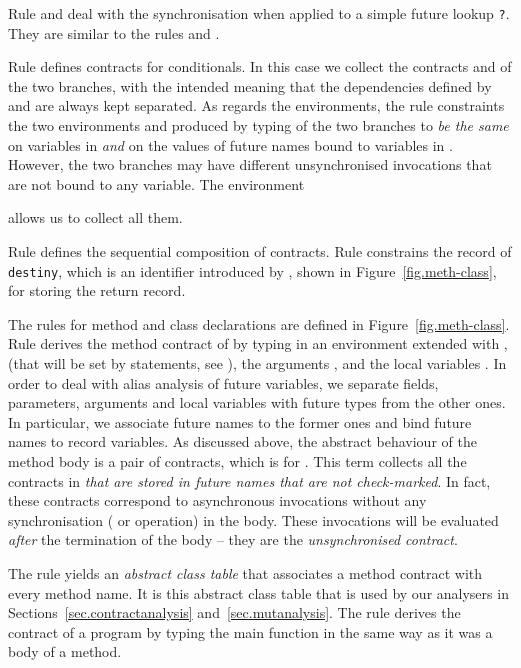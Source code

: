 Rule  and  deal with the 
synchronisation when applied to a simple future lookup {\tt ?}. They are
similar to the rules   and . 


Rule  defines contracts for conditionals. In this case we collect the
contracts  and  of the two bran\-ches, with the intended meaning that 
the dependencies defined by  and  are always kept separated.
As regards the environments, the rule constraints the two environments  and
 produced by typing of the two branches to \emph{be the same} on variables in
 \emph{and} on the values of future names bound to variables
in . However, the two branches may have different unsynchronised
invocations that are not bound to any variable. The environment

allows us to collect all them.

Rule  defines the sequential composition of contracts. 
Rule  constrains the record of {\tt destiny}, which is an identifier
introduced by , shown in Figure~\ref{fig.meth-class}, for 
storing the return record.





\smallskip

The rules for method and class declarations are defined in Figure~\ref{fig.meth-class}.
Rule   derives the method contract of 
 by typing  in an environment 
extended with ,  (that will be set by  statements,
see ),
the arguments , and the local variables . In order to deal with alias 
analysis of future variables, we separate fields, parameters, arguments and local
variables with future types from the other ones. In particular, we associate 
future names to the former ones and bind future names to record variables. As discussed
above, the abstract behaviour of the method body is a pair of contracts, which is
 for . 
This
term  collects all the contracts in  
\emph{that are 
stored in future names that are not check-marked}. In fact, these contracts
correspond to asynchronous invocations without any synchronisation 
( or  operation) in the body. These invocations will be 
evaluated \emph{after} the termination of the body -- they are the \emph{unsynchronised  contract}.

The rule  yields an \emph{abstract class table} that associates a 
method contract with every method name. It is this abstract class table that is 
used by our analysers in Sections~\ref{sec.contractanalysis} and~\ref{sec.mutanalysis}. 
The rule  derives the contract of a {\coreABS} program by 
typing the main function in the same way as it was a body of a method.

